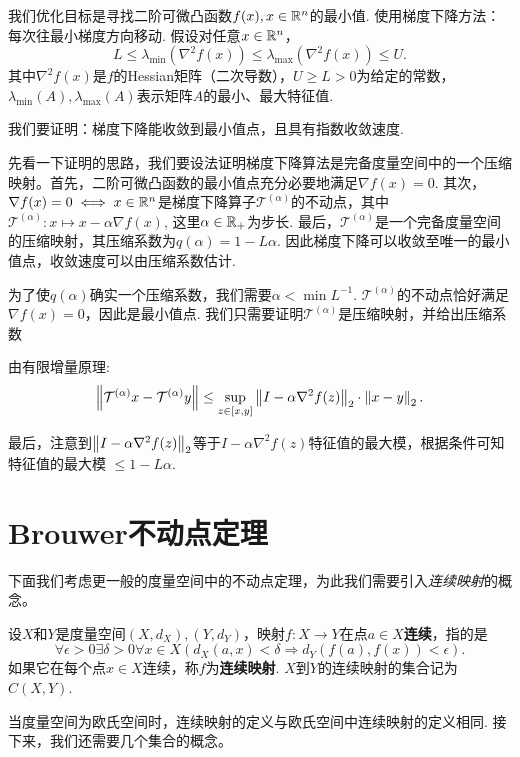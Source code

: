 \begin{example}[梯度下降的收敛性]
我们优化目标是寻找二阶可微凸函数$f(x),x\in \mathbb{R}^n$的最小值. 使用梯度下降方法：每次往最小梯度方向移动.
假设对任意$x\in \mathbb{R}^n$，
    \[L \le \lambda_{\min}(\nabla^2 f(x))\le \lambda_{\max}(\nabla^2 f(x))\le U.\]
    其中$\nabla^2f(x)$是$f$的Hessian矩阵（二次导数），$U\ge L>0$为给定的常数，$\lambda_{\min}(A),\lambda_{\max}(A)$表示矩阵$A$的最小、最大特征值.

我们要证明：梯度下降能收敛到最小值点，且具有指数收敛速度.

先看一下证明的思路，我们要设法证明梯度下降算法是完备度量空间中的一个压缩映射。首先，二阶可微凸函数的最小值点充分必要地满足$\nabla f(x)=0$. 其次，$\nabla f(x)=0 \iff x\in\mathbb{R}^n$是梯度下降算子$\mathcal T^{(\alpha)}$的不动点，其中$\mathcal T^{(\alpha)}: x\mapsto x - \alpha\nabla f(x)$, 这里$\alpha\in \mathbb{R}_+$为步长. 最后，$\mathcal T^{(\alpha)}$是一个完备度量空间的压缩映射，其压缩系数为$q(\alpha)=1-L\alpha$. 因此梯度下降可以收敛至唯一的最小值点，收敛速度可以由压缩系数估计.

为了使$q(\alpha)$确实一个压缩系数，我们需要$\alpha<\min L^{-1}$. $\mathcal T^{(\alpha)}$的不动点恰好满足$\nabla f(x)=0$，因此是最小值点. 我们只需要证明$\mathcal T^{(\alpha)}$是压缩映射，并给出压缩系数

由有限增量原理:
    \[\left\|\mathcal T^{(\alpha)}x - \mathcal T^{(\alpha)}y\right\| \le \sup_{z\in[x,y]}\left\|I - \alpha \nabla^2 f(z)\right\|_2\cdot\left\|x-y\right\|_2.\]
    \item 最后，注意到$\left\|I-\alpha\nabla^2f(z)\right\|_2$等于$I-\alpha\nabla^2f(z)$特征值的最大模，根据条件可知特征值的最大模 $\leq 1-L\alpha$.
\end{example}

\section{Brouwer不动点定理}
下面我们考虑更一般的度量空间中的不动点定理，为此我们需要引入\emph{连续映射}的概念。

\begin{definition}
设$X$和$Y$是度量空间$(X,d_X),(Y,d_Y)$，映射$f:X\to Y$在点$a\in X$\textbf{连续}，指的是
    \[\forall\epsilon>0\exists\delta>0\forall x\in X(d_X(a,x) < \delta\Rightarrow d_Y(f(a),f(x))<\epsilon).\]
如果它在每个点$x\in X$连续，称$f$为\textbf{连续映射}. $X$到$Y$的连续映射的集合记为$C(X,Y)$. 
\end{definition}

当度量空间为欧氏空间时，连续映射的定义与欧氏空间中连续映射的定义相同. 接下来，我们还需要几个集合的概念。

